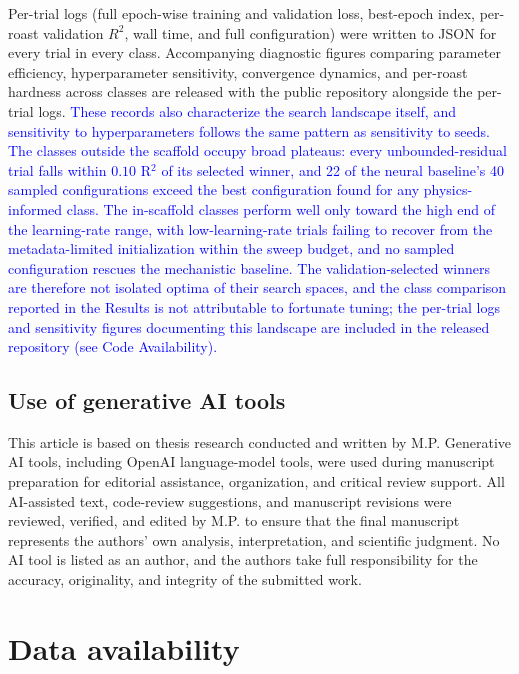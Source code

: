 \documentclass[fleqn,10pt]{wlscirep}
\newcommand{\rev}[1]{\textcolor{blue}{#1}}
\begin{document}
Per-trial logs (full epoch-wise training and validation loss, best-epoch index, per-roast validation $R^2$, wall time, and full configuration) were written to JSON for every trial in every class. Accompanying diagnostic figures comparing parameter efficiency, hyperparameter sensitivity, convergence dynamics, and per-roast hardness across classes are released with the public repository alongside the per-trial logs. \rev{These records also characterize the search landscape itself, and sensitivity to hyperparameters follows the same pattern as sensitivity to seeds. The classes outside the scaffold occupy broad plateaus: every unbounded-residual trial falls within $0.10$ R$^2$ of its selected winner, and 22 of the neural baseline's 40 sampled configurations exceed the best configuration found for any physics-informed class. The in-scaffold classes perform well only toward the high end of the learning-rate range, with low-learning-rate trials failing to recover from the metadata-limited initialization within the sweep budget, and no sampled configuration rescues the mechanistic baseline. The validation-selected winners are therefore not isolated optima of their search spaces, and the class comparison reported in the Results is not attributable to fortunate tuning; the per-trial logs and sensitivity figures documenting this landscape are included in the released repository (see Code Availability).}

\subsection*{Use of generative AI tools}

This article is based on thesis research conducted and written by M.P. Generative AI tools, including OpenAI language-model tools, were used during manuscript preparation for editorial assistance, organization, and critical review support. All AI-assisted text, code-review suggestions, and manuscript revisions were reviewed, verified, and edited by M.P. to ensure that the final manuscript represents the authors' own analysis, interpretation, and scientific judgment. No AI tool is listed as an author, and the authors take full responsibility for the accuracy, originality, and integrity of the submitted work.

\section*{Data availability}
\end{document}
